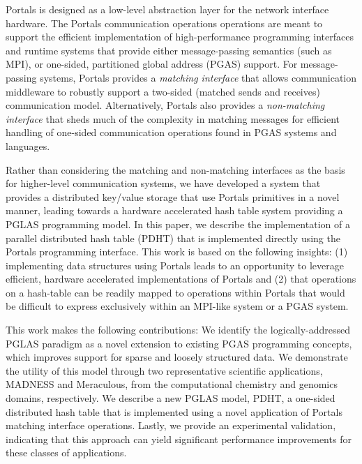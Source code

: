Portals is designed as a low-level abstraction layer for the network interface
hardware. The Portals communication operations operations are
meant to support the efficient implementation of high-performance programming
interfaces and runtime systems that provide either message-passing semantics
(such as MPI), or one-sided, partitioned global address (PGAS) support. For
message-passing systems, Portals provides a {\em matching interface} that
allows communication middleware to robustly support a two-sided (matched sends
and receives) communication model. Alternatively, Portals also provides a {\em
non-matching interface} that sheds much of the complexity in matching messages
for efficient handling of one-sided communication operations found in PGAS
systems and languages.

Rather than considering the matching and non-matching interfaces as
the basis for higher-level communication systems, we have developed a
system that provides a distributed key/value storage that use Portals
primitives in a novel manner, leading towards a hardware accelerated
hash table system providing a PGLAS programming model. In this paper, we describe the implementation of a
parallel distributed hash table (PDHT) that is implemented directly
using the Portals programming interface. This work is based on the
following insights: (1) implementing data structures using Portals
leads to an opportunity to leverage efficient, hardware accelerated
implementations of Portals and (2) that operations on a hash-table
can be readily mapped to operations within
Portals that would be difficult to express exclusively within an
MPI-like system or a PGAS system.

This work makes the following contributions: We identify the
logically-addressed PGLAS paradigm as a novel extension to existing PGAS
programming concepts, which improves support for sparse and loosely structured
data.  We demonstrate the utility of this model through two representative
scientific applications, MADNESS and Meraculous, from the computational
chemistry and genomics domains, respectively.  We describe a new PGLAS model,
PDHT, a one-sided distributed hash table that is implemented using a novel
application of Portals matching interface operations. Lastly, we provide an
experimental validation, indicating that this approach can yield significant
performance improvements for these classes of applications.




